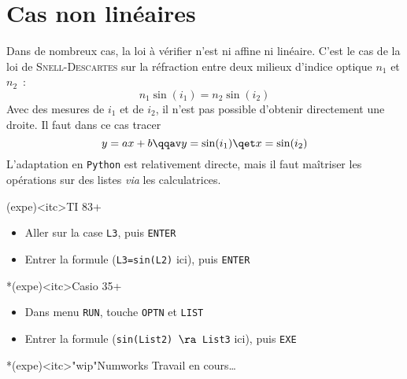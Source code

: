 \documentclass[a4paper, 12pt, garamond]{book}
\begin{document}
\section{Cas non linéaires}
Dans de nombreux cas, la loi à vérifier n'est ni affine ni linéaire. C'est le
cas de la loi de \textsc{Snell}-\textsc{Descartes} sur la réfraction entre deux
milieux d'indice optique $n_1$ et $n_2$~:
\[
	n_1\sin(i_1) = n_2\sin(i_2)
\]
Avec des mesures de $i_1$ et de $i_2$, il n'est pas possible d'obtenir
directement une droite. Il faut dans ce cas tracer
\[
	y = ax+b
	\qqav
	y = \sin(i_1) \qet x = \sin(i_2)
\]
L'adaptation en \texttt{Python} est relativement directe, mais il faut maîtriser
les opérations sur des listes \textit{via} les calculatrices.
\begin{tcbraster}[raster columns=2, raster equal height=rows]
	\begin{tcb}(expe)<itc>{TI 83+}
		\begin{itemize}[leftmargin=10pt]
			\item Aller sur la case \texttt{L3}, puis \texttt{ENTER}
			\item Entrer la formule (\texttt{L3=sin(L2)} ici), puis \texttt{ENTER}
		\end{itemize}
	\end{tcb}
	\begin{tcb}*(expe)<itc>{Casio 35+}
		\begin{itemize}[leftmargin=10pt]
			\item Dans menu \texttt{RUN}, touche \texttt{OPTN} et \texttt{LIST}
			\item Entrer la formule (\texttt{sin(List2) $\ra$ List3} ici), puis
			      \texttt{EXE}
		\end{itemize}
	\end{tcb}
\end{tcbraster}

\begin{tcb}*(expe)<itc>"wip"{Numworks}
	Travail en cours…
	\vfill
\end{tcb}
\end{document}
